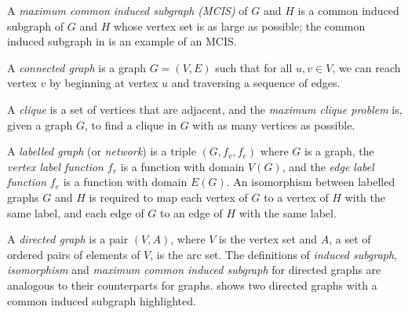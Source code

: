 A \emph{maximum common induced subgraph (MCIS)} of $G$ and $H$ is a common
induced subgraph of $G$ and $H$ whose vertex set is as large as possible; the
common induced subgraph in  is an example of an MCIS.

A \emph{connected graph} is a graph $G=(V,E)$ such that for all $u,v \in V$,
we can reach vertex $v$ by beginning at vertex $u$ and traversing a sequence
of edges.

A \emph{clique} is a set of vertices that are   adjacent, and the
\emph{maximum clique problem} is, given a graph $G$, to find a clique in $G$
with as many vertices as possible.

A \emph{labelled graph} (or \emph{network}) is a triple $(G, f_v, f_e)$
where $G$ is a graph,
the \emph{vertex label function} $f_v$ is a function with domain $V(G)$,
and the \emph{edge label function} $f_e$ is a function with domain $E(G)$.
An isomorphism between labelled graphs $G$ and $H$ is required to map each vertex of
$G$ to a vertex of $H$ with the same label,
and each edge of $G$ to an edge of $H$ with the same label.

A \emph{directed graph} is a pair $(V,A)$, where $V$ is the vertex set and $A$,
a set of ordered pairs of elements of $V$, is the arc set.  The definitions of
\emph{induced subgraph}, \emph{isomorphism} and \emph{maximum common induced
subgraph} for directed graphs are analogous to their counterparts for graphs.
 shows two directed graphs with a common
induced subgraph highlighted.  

